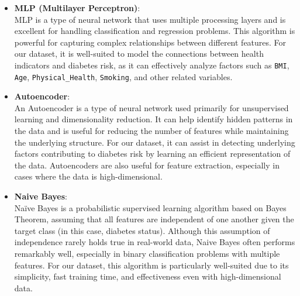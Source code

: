 \begin{itemize}
    \item \textbf{MLP (Multilayer Perceptron)}: \\
    MLP is a type of neural network that uses multiple processing layers and is excellent for handling classification and regression problems. This algorithm is powerful for capturing complex relationships between different features. For our dataset, it is well-suited to model the connections between health indicators and diabetes risk, as it can effectively analyze factors such as \texttt{BMI}, \texttt{Age}, \texttt{Physical\_Health}, \texttt{Smoking}, and other related variables.

    \item \textbf{Autoencoder}: \\
    An Autoencoder is a type of neural network used primarily for unsupervised learning and dimensionality reduction. It can help identify hidden patterns in the data and is useful for reducing the number of features while maintaining the underlying structure. For our dataset, it can assist in detecting underlying factors contributing to diabetes risk by learning an efficient representation of the data. Autoencoders are also useful for feature extraction, especially in cases where the data is high-dimensional.
    
    \item \textbf{Naive Bayes}:\\
     Naïve Bayes is a probabilistic supervised learning algorithm based on Bayes Theorem, assuming that all features are independent of one another given the target class (in this case, diabetes status). Although this assumption of independence rarely holds true in real-world data, Naive Bayes often performs remarkably well, especially in binary classification problems with multiple features. For our dataset, this algorithm is particularly well-suited due to its simplicity, fast training time, and effectiveness even with high-dimensional data.
    \\
    \end{itemize}

